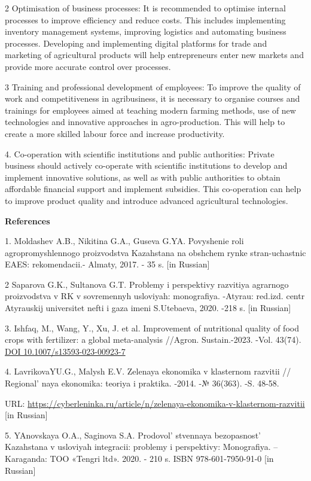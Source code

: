 \begin{multicols}{2}
2 Optimisation of business processes: It is recommended to optimise
internal processes to improve efficiency and reduce costs. This includes
implementing inventory management systems, improving logistics and
automating business processes. Developing and implementing digital
platforms for trade and marketing of agricultural products will help
entrepreneurs enter new markets and provide more accurate control over
processes.

3 Training and professional development of employees: To improve the
quality of work and competitiveness in agribusiness, it is necessary to
organise courses and trainings for employees aimed at teaching modern
farming methods, use of new technologies and innovative approaches in
agro-production. This will help to create a more skilled labour force
and increase productivity.

4. Co-operation with scientific institutions and public authorities:
Private business should actively co-operate with scientific institutions
to develop and implement innovative solutions, as well as with public
authorities to obtain affordable financial support and implement
subsidies. This co-operation can help to improve product quality and
introduce advanced agricultural technologies.
\end{multicols}


{\bfseries References}

1. Moldashev A.B., Nikitina G.A., Guseva G.YA. Povyshenie roli
agropromyshlennogo proizvodstva Kazahstana na obshchem rynke
stran-uchastnic EAES: rekomendacii.- Almaty, 2017. - 35 s. {[}in
Russian{]}

2 Saparova G.K., Sultanova G.T. Problemy i perspektivy razvitiya
agrarnogo proizvodstva v RK v sovremennyh usloviyah: monografiya.
-Atyrau: red.izd. centr Atyrauskij universitet nefti i gaza imeni
S.Utebaeva, 2020. -218 s. {[}in Russian{]}

3. Ishfaq, M., Wang, Y., Xu, J. et al. Improvement of nutritional
quality of food crops with fertilizer: a global meta-analysis //Agron.
Sustain.-2023. -Vol. 43(74).
\href{https://doi.org/10.1007/s13593-023-00923-7}{DOI
10.1007/s13593-023-00923-7}

4. LavrikovaYU.G., Malysh E.V. Zelenaya ekonomika v klasternom razvitii
// Regional' naya ekonomika: teoriya i praktika. -2014.
-№ 36(363). -S. 48-58.

URL:
\url{https://cyberleninka.ru/article/n/zelenaya-ekonomika-v-klasternom-razvitii}
{[}in Russian{]}

5. YAnovskaya O.A., Saginova S.A. Prodovol' stvennaya
bezopasnost' Kazahstana v usloviyah integracii: problemy i perspektivy:
Monografiya. -- Karaganda: TOO «Tengri ltd». 2020. - 210 s. ISBN
978-601-7950-91-0 {[}in Russian{]}

